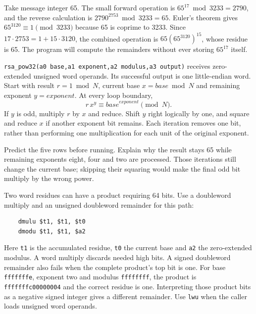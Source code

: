 Take message integer 65. The small forward operation is
$65^{17}\bmod3233=2790$, and the reverse calculation is
$2790^{2753}\bmod3233=65$. Euler's theorem gives
$65^{3120}\equiv1\pmod{3233}$ because 65 is coprime to 3233. Since
$17\cdot2753=1+15\cdot3120$, the combined operation is
$65(65^{3120})^{15}$, whose residue is 65.
The program will compute the remainders without ever storing $65^{17}$ itself.

\texttt{rsa\_pow32(a0 base,a1 exponent,a2 modulus,a3 output)} receives
zero-extended unsigned word operands. Its successful output is one little-endian
word. Start with result $r=1\bmod N$, current base $x=base\bmod N$ and remaining
exponent $y=exponent$. At every loop boundary,
\[
  r\,x^y\equiv \mathit{base}^{\mathit{exponent}}\pmod N.
\]
If $y$ is odd, multiply $r$ by $x$ and reduce. Shift $y$ right logically by one,
and square and reduce $x$ if another exponent bit remains. Each iteration
removes one bit, rather than performing one multiplication for each unit of the
original exponent.



Predict the five rows before running. Explain why the result stays 65 while
remaining exponents eight, four and two are processed. Those iterations still
change the current base; skipping their squaring would make the final odd bit
multiply by the wrong power.



Two word residues can have a product requiring 64 bits. Use a doubleword
multiply and an unsigned doubleword remainder for this path:

\begin{verbatim}
    dmulu $t1, $t1, $t0
    dmodu $t1, $t1, $a2
\end{verbatim}

Here \texttt{t1} is the accumulated residue, \texttt{t0} the current base and
\texttt{a2} the zero-extended modulus. A word multiply discards needed high bits.
A signed doubleword remainder also fails when the complete product's top bit is
one. For base \texttt{fffffffe}, exponent two and modulus \texttt{ffffffff},
the product is \texttt{fffffffc00000004} and the correct residue is one.
Interpreting those product bits as a negative signed integer gives a different
remainder. Use \texttt{lwu} when the caller loads unsigned word operands.

